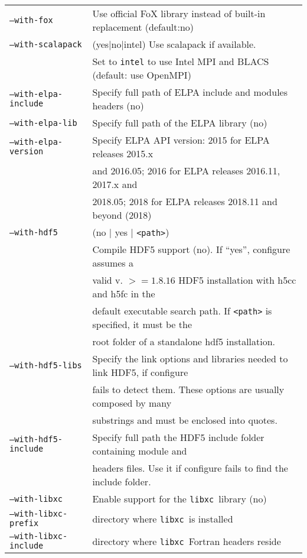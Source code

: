 \documentclass[12pt,a4paper]{article}
\def\libxc{\texttt{libxc}}
\begin{document}
\begin{tabular}{ll}
\texttt{--with-fox} & Use official FoX library instead of built-in replacement (default:no)\\
\texttt{--with-scalapack}& (yes$|$no$|$intel) Use scalapack if available. \\
      &Set to \texttt{intel} to use Intel MPI and BLACS (default: use OpenMPI)\\
\texttt{--with-elpa-include}&   Specify full path of ELPA include and modules
  headers (no)\\
\texttt{--with-elpa-lib}& Specify full path of the ELPA library (no)\\
\texttt{--with-elpa-version}& Specify ELPA API version: 2015 for ELPA releases 2015.x\\
                            & and 2016.05; 2016 for ELPA releases 2016.11, 2017.x and\\
			    & 2018.05; 2018 for ELPA releases 2018.11 and beyond (2018)\\
\texttt{--with-hdf5}&  (no $|$  yes $|$ \texttt{<path>}) \\
	                    & Compile HDF5 support (no). If ``yes'', configure assumes a \\
                            & valid v. $>=1.8.16$ HDF5 installation with h5cc and h5fc in the \\
                            &  default executable search path. If \texttt{<path>} is specified, it must be the  \\
                            & root folder of a standalone hdf5 installation. \\
\texttt{--with-hdf5-libs}   & Specify the link options and libraries needed to link HDF5, if configure \\
                            &  fails to detect them. These options are usually composed by many \\
                            & substrings and must be enclosed into quotes. \\
\texttt{--with-hdf5-include}& Specify full path the HDF5 include folder containing module and \\
&  headers files. Use it if configure fails to find the include folder. \\
\texttt{--with-libxc}        & Enable support for the \libxc\ library (no) \\
\texttt{--with-libxc-prefix} & directory where \libxc\ is installed \\
\texttt{--with-libxc-include}& directory where \libxc\ Fortran headers reside\\
\end{tabular}\\
\end{document}
